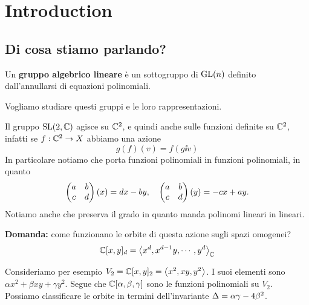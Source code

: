 \chapter*{Introduction}

\section*{Di cosa stiamo parlando?}
Un \textbf{gruppo algebrico lineare} \`e un sottogruppo di $\mathrm{GL}(n)$ definito dall'annullarsi di equazioni polinomiali.

Vogliamo studiare questi gruppi e le loro rappresentazioni.


\begin{example}
Il gruppo $\mathrm{SL}(2,\mathbb{C})$ agisce su $\mathbb{C}^2$, e quindi anche sulle funzioni definite su $\mathbb{C}^2$, infatti se $f:\mathbb{C}^2\to X$ abbiamo una azione
\[g(f)(v)=f(g\ii v)\]
In particolare notiamo che porta funzioni polinomiali in funzioni polinomiali, in quanto
\[\begin{pmatrix}a&b\\c&d\end{pmatrix}(x)=dx-by,\quad\begin{pmatrix}a&b\\c&d\end{pmatrix}(y)=-cx+ay.\]
Notiamo anche che preserva il grado in quanto manda polinomi lineari in lineari.

\textbf{Domanda:} come funzionano le orbite di questa azione sugli spazi omogenei?
\[\mathbb{C}[x,y]_d=\left\langle {x^d,x^{d-1}y,\cdots,y^d}\right\rangle_{\mathbb{C}}\]

Consideriamo per esempio $V_2=\mathbb{C}[x,y]_2=\left\langle {x^2,xy,y^2}\right\rangle$. I suoi elementi sono $\alpha x^2+\beta xy+\gamma y^2$. Segue che $\mathbb{C}[\alpha,\beta,\gamma]$ sono le funzioni polinomiali su $V_2$. Possiamo classificare le orbite in termini dell'invariante $\Delta=\alpha\gamma-4\beta^2$.
\end{example}